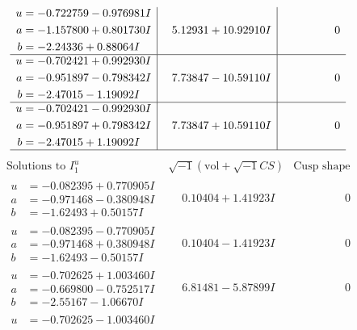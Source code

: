 \documentclass[1p]{elsarticle_modified}
\theoremstyle{definition}
\newcommand{\I}{\sqrt{-1}}
\begin{document}
$$\begin{array}{c|c|c}
\begin{aligned}
u &= -0.722759 - 0.976981 I \\
a &= -1.157800 + 0.801730 I \\
b &= -2.24336 + 0.88064 I\end{aligned}
 & \phantom{-}5.12931 + 10.92910 I & \phantom{-0.000000 } 0 \\ \hline\begin{aligned}
u &= -0.702421 + 0.992930 I \\
a &= -0.951897 - 0.798342 I \\
b &= -2.47015 - 1.19092 I\end{aligned}
 & \phantom{-}7.73847 - 10.59110 I & \phantom{-0.000000 } 0 \\ \hline\begin{aligned}
u &= -0.702421 - 0.992930 I \\
a &= -0.951897 + 0.798342 I \\
b &= -2.47015 + 1.19092 I\end{aligned}
 & \phantom{-}7.73847 + 10.59110 I & \phantom{-0.000000 } 0\\
 \hline 
 \end{array}$$\newpage$$\begin{array}{c|c|c}  
\text{Solutions to }I^u_{1}& \I (\text{vol} + \sqrt{-1}CS) & \text{Cusp shape}\\
 \hline 
\begin{aligned}
u &= -0.082395 + 0.770905 I \\
a &= -0.971468 - 0.380948 I \\
b &= -1.62493 + 0.50157 I\end{aligned}
 & \phantom{-}0.10404 + 1.41923 I & \phantom{-0.000000 } 0 \\ \hline\begin{aligned}
u &= -0.082395 - 0.770905 I \\
a &= -0.971468 + 0.380948 I \\
b &= -1.62493 - 0.50157 I\end{aligned}
 & \phantom{-}0.10404 - 1.41923 I & \phantom{-0.000000 } 0 \\ \hline\begin{aligned}
u &= -0.702625 + 1.003460 I \\
a &= -0.669800 - 0.752517 I \\
b &= -2.55167 - 1.06670 I\end{aligned}
 & \phantom{-}6.81481 - 5.87899 I & \phantom{-0.000000 } 0 \\ \hline\begin{aligned}
u &= -0.702625 - 1.003460 I \\

\end{aligned}
\end{array}$$
\end{document}
